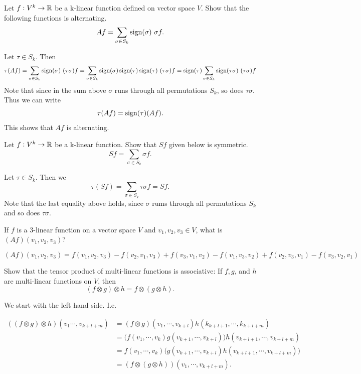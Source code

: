 \begin{problem}
	Let $ f:V^k \to \mathbb{R} $ be a k-linear function defined on vector space $ V $. Show that the following functions is alternating.
	\[ Af = \sum_{\sigma \in S_k} \operatorname{sign}(\sigma)\ \sigma f. \]
\end{problem}
\begin{solution}
	Let $ \tau \in S_k $. Then
	\[ \tau (Af)  = \sum_{\sigma \in S_k} \operatorname{sign}(\sigma)\ (\tau \sigma)f = \sum_{\sigma \in S_k} \operatorname{sign}(\sigma)\operatorname{sign}(\tau)\operatorname{sign}(\tau)\ (\tau \sigma)f = \operatorname{sign}(\tau) \sum_{\sigma \in S_k} \operatorname{sign}(\tau\sigma)\ (\tau \sigma)f  \]
	Note that since in the sum above $ \sigma $ runs through all permutations $ S_k $, so does $ \tau \sigma $. Thus we can write
	\[ \tau (A f) = \operatorname{sign}(\tau) (Af). \]
	This shows that $ Af $ is alternating.
\end{solution}


\begin{problem}
	Let $ f: V^k \to \mathbb{R} $ be a k-linear function. Show that $ Sf $ given below is symmetric.
	\[ Sf = \sum_{\sigma \in S_k} \sigma f. \]
\end{problem}
\begin{solution}
	Let $ \tau \in S_k $. Then we
	\[ \tau (Sf) = \sum_{\sigma \in S_k} \tau \sigma f = Sf. \]
	Note that the last equality above holds, since $ \sigma $ rums through all permutations $ S_k $ and so does $ \tau \sigma. $
\end{solution}


\begin{problem}
	If $ f $ is a 3-linear function on a vector space $ V $ and $ v_1, v_2, v_3 \in V $, what is $ (Af)(v_1, v_2, v_3) $?
\end{problem}
\begin{solution}
	\[ (Af)(v_1, v_2, v_3) = f(v_1,v_2,v_3)-f(v_2,v_1,v_3)+f(v_3,v_1,v_2)-f(v_1,v_3,v_2)+f(v_2,v_3,v_1)-f(v_3,v_2,v_1) \]
\end{solution}

\begin{problem}
	Show that the tensor product of multi-linear functions is associative: If $ f,g $, and $ h $ are multi-linear functions on $ V $, then
	\[ (f\otimes g)\otimes h = f \otimes (g\otimes h). \]
\end{problem}
\begin{solution}
	We start with the left hand side. I.e. 

	\begin{align*}
		((f \otimes g) \otimes h)(v_1 \cdots, v_{k+l+m}) 
		&= (f \otimes g)(v_1,\cdots,v_{k+l})h(k_{k+l+1},\cdots,k_{k+l+m}) \\ 
		&= \big(f(v_1,\cdots,v_k)g(v_{k+1},\cdots,v_{k+l})\big)h(v_{k+l+1},\cdots,v_{k+l+m})\\
		&= f(v_1,\cdots,v_k) \big(g(v_{k+1},\cdots,v_{k+l})h(v_{k+l+1},\cdots,v_{k+l+m})\big) \\
		&= (f \otimes (g \otimes h))(v_{1},\cdots,v_{k+l+m}).
	\end{align*}
\end{solution}

